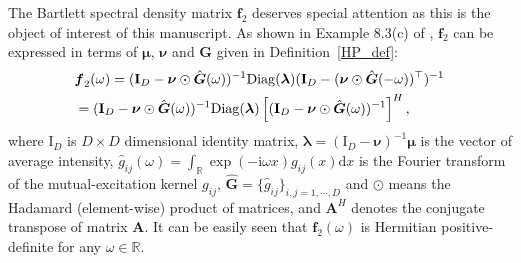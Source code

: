 \documentclass[11pt]{article}
\numberwithin{equation}{section}
\theoremstyle{plain}
\theoremstyle{definition}
\theoremstyle{definition}
\theoremstyle{assumption}
\theoremstyle{proposition}
\theoremstyle{proposition}
\theoremstyle{example}
\theoremstyle{lemma}
\theoremstyle{theorem}
\theoremstyle{remark}
\begin{document}
The Bartlett spectral density matrix $\boldsymbol{f}_2$ deserves special attention as this is the object of interest of this manuscript. As shown in Example 8.3(c) of \citet{Daley_and_Vere-Jones2003}, $\boldsymbol{f}_2$ can be expressed in terms of $\boldsymbol{\mu}$, $\boldsymbol{\nu}$ and $\boldsymbol{G}$ given in Definition~\ref{HP_def}:
\begin{align}
&\boldsymbol{f}_2(\omega) = (\boldsymbol{\mathrm{I}}_{D} - \boldsymbol{\nu}\odot\hat{\boldsymbol{G}}(\omega))^{-1}\mathrm{Diag}(\boldsymbol{\lambda})(\boldsymbol{\mathrm{I}}_{D} - (\boldsymbol{\nu}\odot\hat{\boldsymbol{G}}(-\omega))^{\top})^{-1} \notag \\
&= (\boldsymbol{\mathrm{I}}_{D} - \boldsymbol{\nu}\odot\hat{\boldsymbol{G}}(\omega))^{-1}\mathrm{Diag}(\boldsymbol{\lambda})\left[(\boldsymbol{\mathrm{I}}_{D} - \boldsymbol{\nu}\odot\hat{\boldsymbol{G}}(\omega))^{-1}\right]^{H}, \label{eq_psdmat}
\end{align}
where $\boldsymbol{\mathrm{I}}_{D}$ is $D\times D$ dimensional identity matrix, $\boldsymbol{\lambda} = (\boldsymbol{\mathrm{I}}_{D} - \boldsymbol{\nu})^{-1}\boldsymbol{\mu}$ is the vector of average intensity, $\hat{g}_{ij}({\omega}) = \int_{\mathbb{R}}\exp(-\mathrm{i}{\omega}x)g_{ij}(x)\mathrm{d}x$ is the Fourier transform of the mutual-excitation kernel $g_{ij}$, $\hat{\boldsymbol{G}} = \{\hat{g}_{ij}\}_{i,j=1,\cdots,D}$ and $\odot$ means the Hadamard (element-wise) product of matrices, and $\boldsymbol{A}^H$ denotes the conjugate transpose of matrix $\boldsymbol{A}$. It can be easily seen that 
$\boldsymbol{f}_2({\omega})$ is Hermitian positive-definite for any ${\omega}\in\mathbb{R}$.
\end{document}
